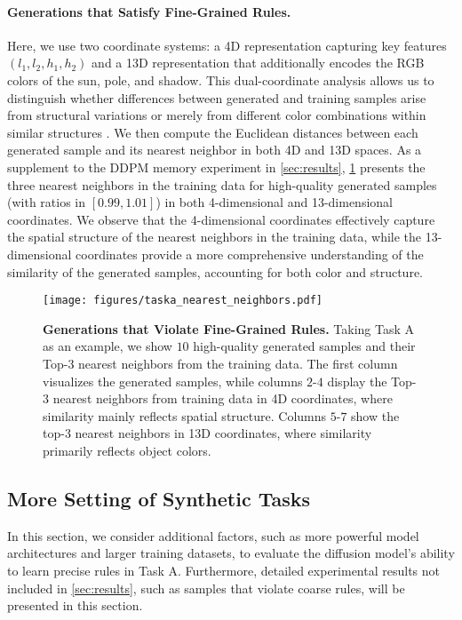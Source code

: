 \paragraph{Generations that Satisfy Fine-Grained Rules.}Here, we use two coordinate systems: a 4D representation capturing key features $(l_1,l_2,h_1,h_2)$ and a 13D representation that additionally encodes the RGB colors of the sun, pole, and shadow. This dual-coordinate analysis allows us to distinguish whether differences between generated and training samples arise from structural variations or merely from different color combinations within similar structures \cite{okawa2024compositional}. We then compute the Euclidean distances between each generated sample and its nearest neighbor in both 4D and 13D spaces. As a supplement to the DDPM memory experiment in \cref{sec:results}, \cref{fig:taska_nearest_neighbors} presents the three nearest neighbors in the training data for high-quality generated samples (with ratios in $[0.99, 1.01]$) in both 4-dimensional and 13-dimensional coordinates. We observe that the 4-dimensional coordinates effectively capture the spatial structure of the nearest neighbors in the training data, while the 13-dimensional coordinates provide a more comprehensive understanding of the similarity of the generated samples, accounting for both color and structure.
\begin{figure}[]
  \centering  \texttt{[image: figures/taska\_nearest\_neighbors.pdf]}
  \vspace*{-3mm}
  \caption{\textbf{Generations that Violate Fine-Grained Rules.} Taking Task A as an example, we show $10$ high-quality generated samples and their Top-$3$ nearest neighbors from the training data. The first column visualizes the generated samples, while columns $2$-$4$ display the Top-$3$ nearest neighbors from training data in 4D coordinates, where similarity mainly reflects spatial structure. Columns $5$-$7$ show the top-3 nearest neighbors in 13D coordinates, where similarity primarily reflects object colors.}
\label{fig:taska_nearest_neighbors}
\end{figure}
\subsection{More Setting of Synthetic Tasks}
\label{app:More Setting of Synthetic Tasks}
In this section, we consider additional factors, such as more powerful model architectures and larger training datasets, to evaluate the diffusion model's ability to learn precise rules in Task A. Furthermore, detailed experimental results not included in \cref{sec:results}, such as samples that violate coarse rules, will be presented in this section.
